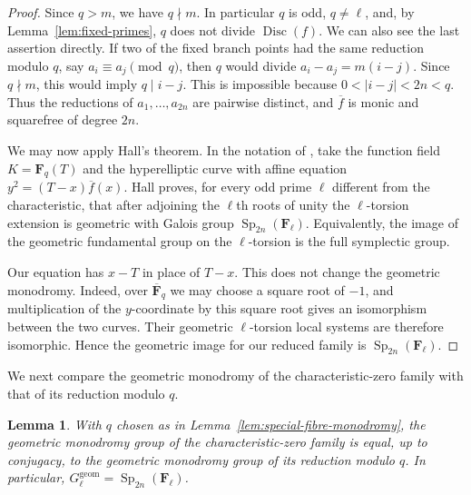 \documentclass[11pt,hidelinks]{amsart}
\newtheorem{lemma}[theorem]{Lemma}
\newcommand{\F}{\mathbf F}
\newcommand{\Sp}{\operatorname{Sp}}
\newcommand{\Disc}{\operatorname{Disc}}
\begin{document}
\begin{proof}
Since $q>m$, we have $q\nmid m$.  In particular $q$ is odd,
$q\neq\ell$, and, by Lemma~\ref{lem:fixed-primes}, $q$ does not divide
$\Disc(f)$.  We can also see the last assertion directly.  If two of
the fixed branch points had the same reduction modulo $q$, say
$a_i\equiv a_j\pmod q$, then $q$ would divide
$a_i-a_j=m(i-j)$.  Since $q\nmid m$, this would imply $q\mid i-j$.
This is impossible because $0<|i-j|<2n<q$.  Thus the reductions of
$a_1,\ldots,a_{2n}$ are pairwise distinct, and $\overline f$ is monic
and squarefree of degree $2n$.

We may now apply Hall's theorem.  In the notation of
\cite[Theorem~4.1]{HallBig2008}, take the function field
$K=\F_q(T)$ and the hyperelliptic curve with affine equation
$y^2=(T-x)\overline f(x)$.  Hall proves, for every odd prime $\ell$
different from the characteristic, that after adjoining the
$\ell$th roots of unity the $\ell$-torsion extension is geometric
with Galois group $\Sp_{2n}(\F_\ell)$.  Equivalently, the image of the
geometric fundamental group on the $\ell$-torsion is the full
symplectic group.

Our equation has $x-T$ in place of $T-x$.  This does not change the
geometric monodromy.  Indeed, over $\overline{\F}_q$ we may choose a
square root of $-1$, and multiplication of the $y$-coordinate by this
square root gives an isomorphism between the two curves.  Their
geometric $\ell$-torsion local systems are therefore isomorphic.
Hence the geometric image for our reduced family is
$\Sp_{2n}(\F_\ell)$.
\end{proof}

We next compare the geometric monodromy of the characteristic-zero
family with that of its reduction modulo $q$.

\begin{lemma}\label{lem:specialization-monodromy}
With $q$ chosen as in Lemma~\ref{lem:special-fibre-monodromy}, the
geometric monodromy group of the characteristic-zero family is equal,
up to conjugacy, to the geometric monodromy group of its reduction
modulo $q$.  In particular,
$G^{\mathrm{geom}}_\ell=\Sp_{2n}(\F_\ell)$.
\end{lemma}
\end{document}
